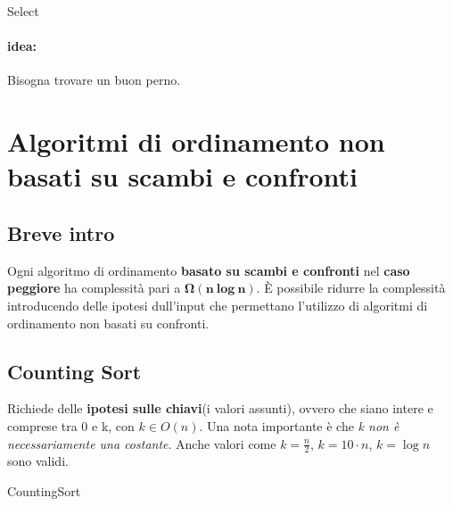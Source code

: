 \documentclass{article}
\begin{document}
\begin{algorithm}[H]
\caption{Select}
\end{algorithm}
\paragraph{idea:} Bisogna trovare un buon perno.

\section{Algoritmi di ordinamento non basati su scambi e confronti}

\subsection{Breve intro}
Ogni algoritmo di ordinamento \textbf{basato su scambi e confronti} nel \textbf{caso peggiore} ha complessità pari a $\mathbf{\Omega(n \ log \ n)}$. 
È possibile ridurre la complessità introducendo delle ipotesi dull'input che permettano l'utilizzo di algoritmi di ordinamento non basati su confronti.

\hypertarget{countingsort}{\subsection{Counting Sort}} %
Richiede delle \textbf{ipotesi sulle chiavi}(i valori assunti), ovvero che siano intere e comprese tra 0 e k, con \textbf{$k \in O(n)$}. Una nota importante è 
che \textit{k non è necessariamente una costante}. Anche valori come $k = \frac{n}{2}$, $k = 10 \cdot n$, $k = \log n$ sono validi.


\begin{algorithm}[H]
\caption{CountingSort}
\end{algorithm}
\end{document}
